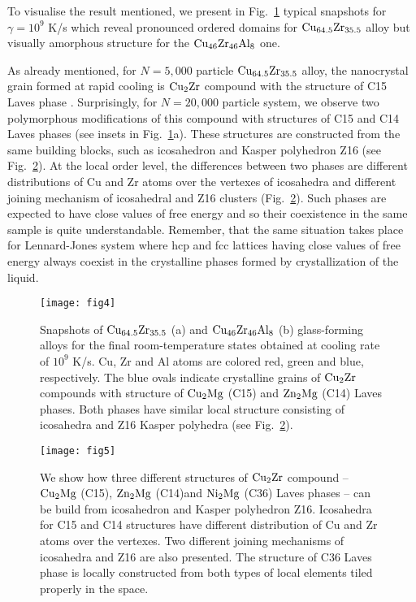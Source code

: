 \documentclass[jcp,twocolumn,superscriptaddress,floatfix,graphicx,showpacs]{revtex4-1}
\begin{document}
To visualise the result mentioned, we present in Fig.~\ref{fig:snapshots} typical snapshots for $\gamma = 10^{9}$ K/s which reveal pronounced ordered domains for ${\rm Cu_{64.5}Zr_{35.5}}$ alloy but visually amorphous structure for the  ${\rm Cu_{46}Zr_{46}Al_{8}}$ one.

As already mentioned, for $N=5,000$ particle ${\rm Cu_{64.5}Zr_{35.5}}$ alloy, the nanocrystal grain formed at rapid cooling is ${\rm Cu_2Zr}$ compound with the structure of C15 Laves phase \cite{Ryltsev2016JCP}. Surprisingly, for $N=20,000$ particle system, we observe two polymorphous modifications of this compound with structures of  C15 and C14 Laves phases (see insets in Fig.~\ref{fig:snapshots}a). These structures are constructed from the same building blocks, such as icosahedron and Kasper polyhedron Z16 (see Fig.~\ref{fig:laves}). At the local order level, the differences between two phases are different distributions of Cu and Zr atoms over the vertexes of icosahedra and different joining mechanism of icosahedral and Z16 clusters  (Fig.~\ref{fig:laves}). Such phases are expected to have close values of free energy and so their coexistence in the same sample is quite understandable. Remember, that the same situation takes place for Lennard-Jones system where hcp and fcc lattices having close values of free energy always coexist in the crystalline phases formed by crystallization of the liquid.

\begin{figure}
  \centering
  \texttt{[image: fig4]}\\
  \caption{ Snapshots of ${\rm Cu_{64.5}Zr_{35.5}}$ (a) and ${\rm Cu_{46}Zr_{46}Al_{8}}$ (b) glass-forming alloys for the final room-temperature states obtained at cooling rate of $10^9$ K/s. Cu, Zr and Al atoms are colored red, green and blue, respectively. The blue ovals indicate crystalline grains of ${\rm Cu_2Zr}$ compounds with structure of ${\rm Cu_2Mg}$ (C15) and ${\rm Zn_2Mg}$ (C14) Laves phases. Both phases have similar local structure consisting of icosahedra and Z16 Kasper polyhedra (see Fig.~\ref{fig:laves}). }
   \label{fig:snapshots}
\end{figure}

\begin{figure}
  \centering
  \texttt{[image: fig5]}\\
  \caption{We show how three different structures of ${\rm Cu_2Zr}$ compound -- ${\rm Cu_2Mg}$ (C15), ${\rm Zn_2Mg}$ (C14)and ${\rm Ni_2Mg}$ (C36) Laves phases -- can be build from icosahedron and Kasper polyhedron Z16. Icosahedra for C15 and C14 structures have different distribution of Cu and Zr atoms over the vertexes. Two different joining mechanisms of icosahedra and Z16 are also presented. The structure of C36 Laves phase is locally constructed from both types of local elements tiled properly in the space.}
   \label{fig:laves}
\end{figure}
\end{document}
